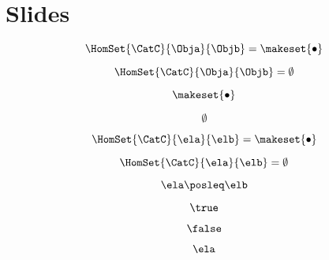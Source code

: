 
\section{Slides}
\label{sec:enrichment-slides}

\begin{forslides}

    \begin{equation}
        \label{eq:slides_enrichment_1}
       \HomSet{\CatC}{\Obja}{\Objb} = \makeset{ \bullet }
    \end{equation}
    
     \begin{equation}
        \label{eq:slides_enrichment_2}
       \HomSet{\CatC}{\Obja}{\Objb} = \emptyset
    \end{equation}
    
     \begin{equation}
        \label{eq:slides_enrichment_3}
       \makeset{ \bullet }
    \end{equation}
    
     \begin{equation}
        \label{eq:slides_enrichment_4}
       \emptyset
    \end{equation}
    
     \begin{equation}
        \label{eq:slides_enrichment_5}
       \HomSet{\CatC}{\ela}{\elb} = \makeset{ \bullet }
    \end{equation}
    
     \begin{equation}
        \label{eq:slides_enrichment_6}
       \HomSet{\CatC}{\ela}{\elb} = \emptyset
    \end{equation}
    
     \begin{equation}
        \label{eq:slides_enrichment_7}
       \ela \posleq \elb
    \end{equation}
    
     \begin{equation}
        \label{eq:slides_enrichment_8}
      \true
    \end{equation}
    
     \begin{equation}
        \label{eq:slides_enrichment_9}
        \false
    \end{equation}
    
     \begin{equation}
        \label{eq:slides_enrichment_10}
        \ela
    \end{equation}
    

\end{forslides}
